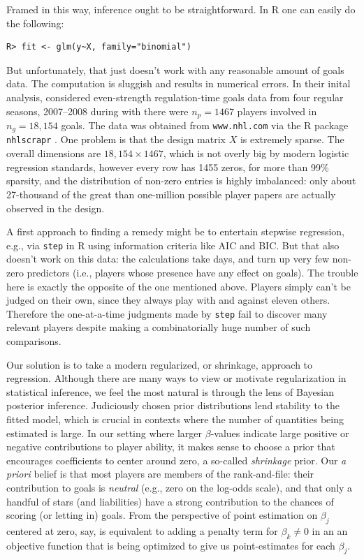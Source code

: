 Framed in this way, inference ought to be straightforward.  In {\sf R}
one can easily do the following:
\begin{verbatim}
R> fit <- glm(y~X, family="binomial")
\end{verbatim}
But unfortunately, that just doesn't work with any reasonable amount of goals
data.  The computation is sluggish and results in numerical errors. In their
inital analysis, \cite{gramacy:jensen:taddy:2013} considered even-strength
regulation-time goals data from four regular seasons, 2007--2008 during
with there were $n_p = 1467$ players involved in $n_g = 18,\!154$ goals.  The
data was obtained from \verb!www.nhl.com! via the {\sf R} package {\tt
nhlscrapr} \cite{nhlscrapr}. One problem is that the design matrix $X$ is
extremely sparse. The overall dimensions are $18,\!154 \times 1467$, which is
not overly big by modern logistic regression standards, however every row
has 1455 zeros, for more than 99\% sparsity, and the distribution of non-zero
entries is highly imbalanced: only about 27-thousand of the great than
one-million possible player papers are actually observed in the design.  

A first approach to finding a remedy might be to entertain stepwise
regression, e.g., via {\tt step} in {\sf R} using information criteria like
AIC and BIC.  But that also doesn't work on this data: the calculations take
days, and turn up very few non-zero predictors (i.e., players whose presence
have any effect on goals).  The trouble here is exactly the opposite of the
one mentioned above.  Players simply can't be judged on their own, since they
always play with and against eleven others.  Therefore the one-at-a-time
judgments made by {\tt step} fail to discover many relevant players despite
making a combinatorially huge number of such comparisons.


Our solution is to take a modern regularized, or shrinkage, approach to
regression.  Although there are many ways to view or motivate regularization
in statistical inference, we feel the most natural is through the lens of
Bayesian posterior inference. Judiciously chosen prior distributions lend
stability to the fitted model, which is crucial in contexts where the number
of quantities being estimated is large. In our setting where larger
$\beta$-values indicate large positive or negative contributions to player
ability, it makes sense to choose a prior that encourages coefficients to
center around zero, a so-called {\em shrinkage} prior.  Our {\em a priori}
belief is that most players are members of the rank-and-file: their
contribution to goals is {\em neutral} (e.g., zero on the log-odds scale), and
that only a handful of stars (and liabilities) have a strong contribution to
the chances of scoring (or letting in) goals.  From the perspective of point
estimation on $\beta_j$ centered at zero, say, is equivalent to adding a
penalty term for $\beta_k \ne 0$ in an an objective function that is being
optimized to give us point-estimates for each $\beta_j$.

